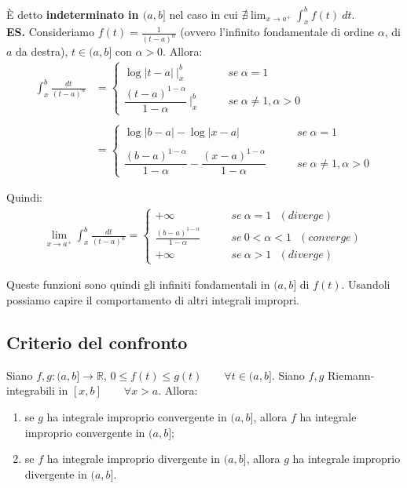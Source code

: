 \documentclass{article}
\begin{document}
\noindent È detto \textbf{indeterminato in $(a, b]$} nel caso in cui $\nexists \lim_{x \to a^+} \int_x^b f(t) \ dt$.\\

\noindent\textbf{ES.} Consideriamo $f(t) = \frac{1}{(t - a)^\alpha}$ (ovvero l'infinito fondamentale di ordine $\alpha$, di $a$ da destra), $t \in (a, b]$ con $\alpha > 0$. Allora:
\begin{align*}
    \int_x^b \frac{dt}{(t - a)^\alpha} &= \begin{cases}
        \log|t - a| \ \bigg|_x^b & \qquad se \ \alpha = 1 \\
        \dfrac{(t - a)^{1 - \alpha}}{1 - \alpha} \ \bigg|_x^b & \qquad se \ \alpha \neq 1, \alpha > 0
    \end{cases}\\\\
    &= \begin{cases}
        \log|b - a| - \log|x - a| & \qquad se \ \alpha = 1 \\\\
        \dfrac{(b - a)^{1 - \alpha}}{1 - \alpha} - \dfrac{(x - a)^{1 - \alpha}}{1 - \alpha} & \qquad se \ \alpha \neq 1, \alpha > 0
    \end{cases}
\end{align*}

\noindent Quindi:
\begin{align*}
    \lim_{x \to a^+} \int_x^b \frac{dt}{(t - a)^\alpha} = \begin{cases}
        +\infty & \qquad se \ \alpha = 1 \ \ \ (diverge) \\
        \frac{(b - a)^{1 - \alpha}}{1 - \alpha} & \qquad se \ 0 < \alpha < 1 \ \ \ (converge) \\
        +\infty & \qquad se \ \alpha > 1 \ \ \ (diverge)
    \end{cases}
\end{align*}

\noindent Queste funzioni sono quindi gli infiniti fondamentali in $(a, b]$ di $f(t)$. Usandoli possiamo capire il comportamento di altri integrali impropri.

\subsection{Criterio del confronto}
Siano $f, g: (a, b] \xrightarrow{} \mathbb{R}$, $0 \leq f(t) \leq g(t) \qquad \forall t \in (a, b]$. Siano $f, g$ Riemann-integrabili in $[x, b] \qquad \forall x > a$. Allora:
\begin{enumerate}
    \item se $g$ ha integrale improprio convergente in $(a, b]$, allora $f$ ha integrale improprio convergente in $(a, b]$;
    \item se $f$ ha integrale improprio divergente in $(a, b]$, allora $g$ ha integrale improprio divergente in $(a, b]$.
\end{enumerate}
\end{document}
